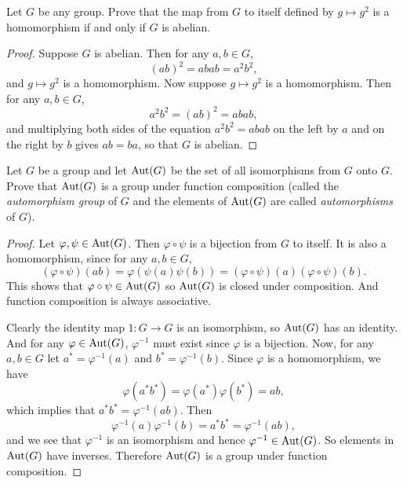  Let $G$ be any group. Prove that the map from $G$ to
itself defined by $g\mapsto g^2$ is a homomorphism if and only if $G$
is abelian.
\begin{proof}
  Suppose $G$ is abelian. Then for any $a,b\in G$,
  \begin{equation*}
    (ab)^2 = abab = a^2b^2,
  \end{equation*}
  and $g\mapsto g^2$ is a homomorphism. Now suppose $g\mapsto g^2$ is
  a homomorphism. Then for any $a,b\in G$,
  \begin{equation*}
    a^2b^2 = (ab)^2 = abab,
  \end{equation*}
  and multiplying both sides of the equation $a^2b^2 = abab$ on the
  left by $a$ and on the right by $b$ gives $ab = ba$, so that $G$ is
  abelian.
\end{proof}

 Let $G$ be a group and let $\operatorname{Aut}(G)$ be the set of all
isomorphisms from $G$ onto $G$. Prove that $\operatorname{Aut}(G)$ is a group under
function composition (called the {\em automorphism group} of $G$ and
the elements of $\operatorname{Aut}(G)$ are called {\em automorphisms} of $G$).
\begin{proof}
  Let $\varphi,\psi\in\operatorname{Aut}(G)$. Then $\varphi\circ\psi$ is a bijection
  from $G$ to itself. It is also a homomorphism, since for any
  $a,b\in G$,
  \begin{equation*}
    (\varphi\circ\psi)(ab) = \varphi(\psi(a)\psi(b))
    = (\varphi\circ\psi)(a)(\varphi\circ\psi)(b).
  \end{equation*}
  This shows that $\varphi\circ\psi\in\operatorname{Aut}(G)$ so $\operatorname{Aut}(G)$ is closed
  under composition. And function composition is always associative.

  Clearly the identity map $1\colon G\to G$ is an isomorphism, so
  $\operatorname{Aut}(G)$ has an identity. And for any $\varphi\in\operatorname{Aut}(G)$,
  $\varphi^{-1}$ must exist since $\varphi$ is a bijection. Now, for
  any $a,b\in G$ let $a^* = \varphi^{-1}(a)$ and
  $b^* = \varphi^{-1}(b)$. Since $\varphi$ is a homomorphism, we have
  \begin{equation*}
    \varphi(a^*b^*) = \varphi(a^*)\varphi(b^*) = ab,
  \end{equation*}
  which implies that $a^*b^* = \varphi^{-1}(ab)$. Then
  \begin{equation*}
    \varphi^{-1}(a)\varphi^{-1}(b) = a^*b^* = \varphi^{-1}(ab),
  \end{equation*}
  and we see that $\varphi^{-1}$ is an isomorphism and hence
  $\varphi^{-1}\in\operatorname{Aut}(G)$. So elements in $\operatorname{Aut}(G)$ have
  inverses. Therefore $\operatorname{Aut}(G)$ is a group under function composition.
\end{proof}

